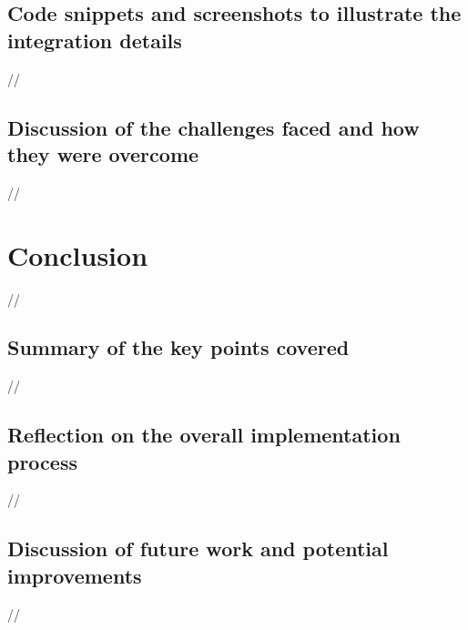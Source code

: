 \subsection {Code snippets and screenshots to illustrate the integration details}
//
\subsection {Discussion of the challenges faced and how they were overcome}

//
    \section {Conclusion}
//
    \subsection {Summary of the key points covered}
//
    \subsection {Reflection on the overall implementation process}
//
    \subsection {Discussion of future work and potential improvements}

    //